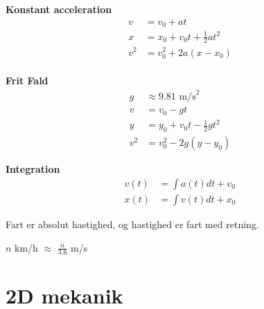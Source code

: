 \begin{table}[h]
\begin{minipage}
        \textbf{Konstant acceleration}
        \begin{align*}
            v &= v_0 + at \\
            x &= x_0 + v_0t + \frac{1}{2}at^2 \\
            v^2 &= v_0^2 + 2a(x-x_0)
        \end{align*}
        \vspace{2em} \\
        \textbf{Frit Fald}
        \begin{align*}
            g &\approx 9.81 \text{ m/s}^2 \\
            v &= v_0 - gt \\
            y &= y_0 + v_0t - \frac{1}{2}gt^2 \\
            v^2 &= v_0^2 - 2g(y-y_0)
        \end{align*}
    \end{minipage}
\end{table}

\textbf{Integration}
\begin{align*}
    v(t) &= \int a(t) dt + v_0 \\
    x(t) &= \int v(t) dt + x_0 
\end{align*}

Fart er absolut hastighed, og hastighed er fart med retning.

$n$ km/h $\approx$ $\frac{n}{3.6}$ m/s

\section{2D mekanik}
